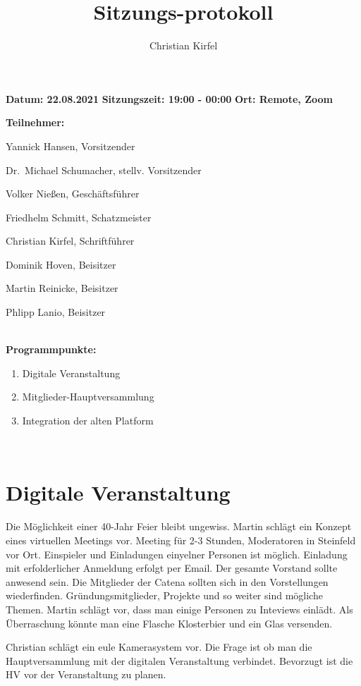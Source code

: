 \documentclass[a4paper, 11pt]{article}
\title{Sitzungs-protokoll}
\author{Christian Kirfel}
\begin{document}
\pagestyle{style1}

\textbf{Datum: 22.08.2021} %
\textbf{Sitzungszeit: 19:00 - 00:00}
\textbf{Ort: Remote, Zoom} %

\textbf{Teilnehmer:} %
\begin{description}
\item Yannick Hansen, Vorsitzender
\item Dr.~Michael Schumacher, stellv. Vorsitzender
\item Volker Nießen, Geschäftsführer
\item Friedhelm Schmitt, Schatzmeister
\item Christian Kirfel, Schriftführer
\item Dominik Hoven, Beisitzer
\item Martin Reinicke, Beisitzer
\item Phlipp Lanio, Beisitzer
\end{description}

\makebox[\linewidth]{\rule{\linewidth}{0.4pt}}\\
\textbf{Programmpunkte:} 
\begin{enumerate}
\item Digitale Veranstaltung
\item Mitglieder-Hauptversammlung
\item Integration der alten Platform
\end{enumerate}
\makebox[\linewidth]{\rule{\linewidth}{0.4pt}}\\

\newpage

\section*{Digitale Veranstaltung}

Die Möglichkeit einer 40-Jahr Feier bleibt ungewiss.
Martin schlägt ein Konzept eines virtuellen Meetings vor.
Meeting für 2-3 Stunden, Moderatoren in Steinfeld vor Ort.
Einspieler und Einladungen einyelner Personen ist möglich.
Einladung mit erfolderlicher Anmeldung erfolgt per Email.
Der gesamte Vorstand sollte anwesend sein.
Die Mitglieder der Catena sollten sich in den Vorstellungen wiederfinden.
Gründungsmitglieder, Projekte und so weiter sind mögliche Themen.
Martin schlägt vor, dass man einige Personen zu Inteviews einlädt.
Als Überraschung könnte man eine Flasche Klosterbier und ein Glas versenden.

Christian schlägt ein eule Kamerasystem vor.
Die Frage ist ob man die Hauptversammlung mit der digitalen Veranstaltung verbindet.
Bevorzugt ist die HV vor der Veranstaltung zu planen.
\end{document}
